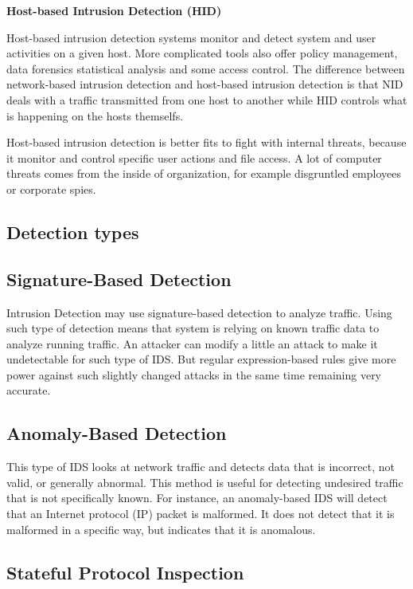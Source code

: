 \documentclass[thesis=M,english]{FITthesis}[2011/07/15]
\begin{document}
\textbf{Host-based Intrusion Detection (HID)}

Host-based intrusion detection systems monitor and detect system and user activities on a given host. More complicated tools also offer policy management, data forensics statistical analysis and some access control. The difference between network-based intrusion detection and host-based intrusion detection is that NID deals with a traffic transmitted from one host to another while HID controls what is happening on the hosts themselfs.

Host-based intrusion detection is better fits to fight with internal threats, because it monitor and control specific user actions and file access. A lot of computer threats comes from the inside of organization, for example disgruntled employees or corporate spies.

\subsection*{Detection types}

\subsection*{Signature-Based Detection}

Intrusion Detection may use signature-based detection to analyze traffic. Using such type of detection means that system is relying on known traffic data to analyze running traffic. An attacker can modify a little an attack to make it undetectable for such type of IDS. But regular expression-based rules give more power against such slightly changed attacks in the same time remaining very accurate.

\subsection*{Anomaly-Based Detection}

This type of IDS looks at network traffic and detects data that is incorrect, not valid, or generally abnormal. This method is useful for detecting undesired traffic that is not specifically known. For instance, an anomaly-based IDS will detect that an Internet protocol (IP) packet is malformed. It does not detect that it is malformed in a specific way, but indicates that it is anomalous.

\subsection*{Stateful Protocol Inspection}
\end{document}
